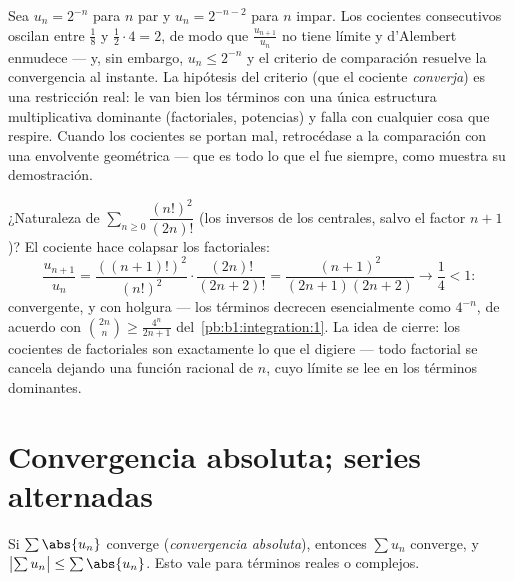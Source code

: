 \begin{example}\label{ex:b1:series:rationotnecessary}
Sea $u_n = 2^{-n}$ para $n$ par y $u_n = 2^{-n-2}$ para $n$ impar.
Los cocientes consecutivos oscilan entre $\frac{1}{8}$ y
$\frac12\cdot4 = 2$, de modo que $\frac{u_{n+1}}{u_n}$ no tiene
límite y d'Alembert enmudece --- y, sin embargo, $u_n \leq 2^{-n}$ y
el criterio de comparación resuelve la convergencia al instante. La
hipótesis del criterio (que el cociente \emph{converja}) es una
restricción real: le van bien los términos con una única estructura
multiplicativa dominante (factoriales, potencias) y falla con
cualquier cosa que respire. Cuando los cocientes se portan mal,
retrocédase a la comparación con una envolvente geométrica --- que es
todo lo que el  fue siempre, como muestra su
demostración.
\end{example}

\begin{example}\label{ex:b1:series:ratiobinom}
¿Naturaleza de $\sum_{n\geq0} \dfrac{(n!)^2}{(2n)!}$ (los inversos de
los  centrales, salvo el factor $n + 1$)? El
cociente hace colapsar los factoriales:
\[
\frac{u_{n+1}}{u_n}
= \frac{((n+1)!)^2}{(n!)^2}\cdot\frac{(2n)!}{(2n+2)!}
= \frac{(n+1)^2}{(2n+1)(2n+2)}
\longrightarrow \frac14 < 1 :
\]
convergente, y con holgura --- los términos decrecen esencialmente
como $4^{-n}$, de acuerdo con
$\binom{2n}{n} \geq \frac{4^n}{2n+1}$ del~\cref{pb:b1:integration:1}.
La idea de cierre: los cocientes de factoriales son exactamente lo
que el  digiere --- todo factorial se cancela
dejando una función racional de $n$, cuyo límite se lee en los
términos dominantes.
\end{example}

\section{Convergencia absoluta; series alternadas}

\begin{theorem}\label{thm:b1:series:absolute}
Si $\sum \abs{u_n}$ converge (\emph{convergencia
absoluta}), entonces $\sum u_n$
converge, y $\bigl|\sum u_n\bigr| \leq \sum \abs{u_n}$. Esto vale
para términos reales o complejos.
\end{theorem}

